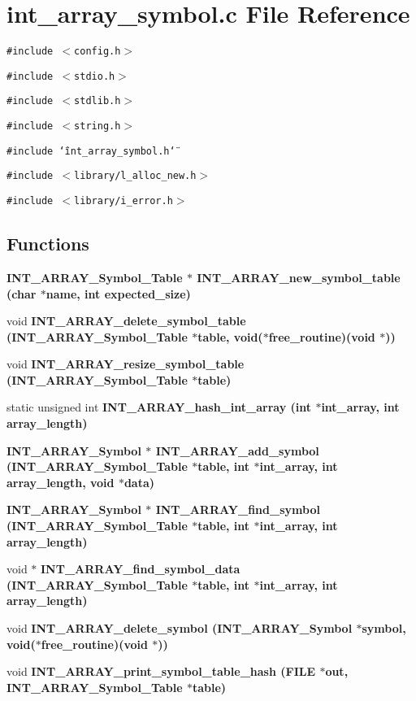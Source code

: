 \section{int\_\-array\_\-symbol.c File Reference}
\label{int__array__symbol_8c}
{\tt \#include $<$config.h$>$}\par
{\tt \#include $<$stdio.h$>$}\par
{\tt \#include $<$stdlib.h$>$}\par
{\tt \#include $<$string.h$>$}\par
{\tt \#include \char`\"{}int\_\-array\_\-symbol.h\char`\"{}}\par
{\tt \#include $<$library/l\_\-alloc\_\-new.h$>$}\par
{\tt \#include $<$library/i\_\-error.h$>$}\par
\subsection*{Functions}
\begin{CompactItemize}
\item 
\bf{INT\_\-ARRAY\_\-Symbol\_\-Table} $\ast$ \bf{INT\_\-ARRAY\_\-new\_\-symbol\_\-table} (char $\ast$\bf{name}, int expected\_\-size)
\item 
void \bf{INT\_\-ARRAY\_\-delete\_\-symbol\_\-table} (\bf{INT\_\-ARRAY\_\-Symbol\_\-Table} $\ast$table, void($\ast$free\_\-routine)(void $\ast$))
\item 
void \bf{INT\_\-ARRAY\_\-resize\_\-symbol\_\-table} (\bf{INT\_\-ARRAY\_\-Symbol\_\-Table} $\ast$table)
\item 
static unsigned int \bf{INT\_\-ARRAY\_\-hash\_\-int\_\-array} (int $\ast$int\_\-array, int array\_\-length)
\item 
\bf{INT\_\-ARRAY\_\-Symbol} $\ast$ \bf{INT\_\-ARRAY\_\-add\_\-symbol} (\bf{INT\_\-ARRAY\_\-Symbol\_\-Table} $\ast$table, int $\ast$int\_\-array, int array\_\-length, void $\ast$data)
\item 
\bf{INT\_\-ARRAY\_\-Symbol} $\ast$ \bf{INT\_\-ARRAY\_\-find\_\-symbol} (\bf{INT\_\-ARRAY\_\-Symbol\_\-Table} $\ast$table, int $\ast$int\_\-array, int array\_\-length)
\item 
void $\ast$ \bf{INT\_\-ARRAY\_\-find\_\-symbol\_\-data} (\bf{INT\_\-ARRAY\_\-Symbol\_\-Table} $\ast$table, int $\ast$int\_\-array, int array\_\-length)
\item 
void \bf{INT\_\-ARRAY\_\-delete\_\-symbol} (\bf{INT\_\-ARRAY\_\-Symbol} $\ast$symbol, void($\ast$free\_\-routine)(void $\ast$))
\item 
void \bf{INT\_\-ARRAY\_\-print\_\-symbol\_\-table\_\-hash} (FILE $\ast$out, \bf{INT\_\-ARRAY\_\-Symbol\_\-Table} $\ast$table)
\end{CompactItemize}

